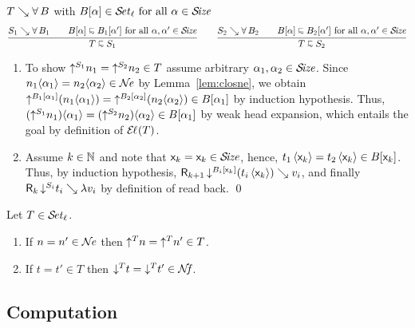 \documentclass[acmlarge,review,anonymous]{acmart}\settopmatter{printfolios=true}
\makeatletter
\newenvironment{proof*}[1][\proofname]{\par
  \normalfont \topsep6\p@\@plus6\p@\relax
  \trivlist
  \item[\@proofindent\hskip\labelsep
        {\@proofnamefont #1\@addpunct{.}}]\ignorespaces
}{%
  \endtrivlist\@endpefalse
}
\makeatother
\begin{document}
\begin{proof*}
\begin{caselist}
\nextcase $T \evalsto \forallT B$ with $B[\alpha] \in \SET[\ell] \mforall \alpha \in \SIZE$
\begin{gather*}
  \ru{S_1 \evalsto \forallT{B_1} \qquad
      B[\alpha] \shape B_1[\alpha'] \mforall \alpha, \alpha' \in \SIZE
    }{T \shape S_1}
\qquad
  \ru{S_2 \evalsto \forallT{B_2} \qquad
      B[\alpha] \shape B_2[\alpha'] \mforall \alpha, \alpha' \in \SIZE
    }{T \shape S_2}
\end{gather*}
\begin{enumerate}
\item To show $\up{S_1}{n_1} = \up{S_2}{n_2} \in T$ assume arbitrary $\alpha_1,\alpha_2 \in \SIZE$.
  Since $n_1 \ann{\alpha_1} = n_2 \ann{\alpha_2} \in \NE$ by Lemma~\ref{lem:closne}, we obtain
  $\up{B_1[\alpha_1]}{(n_1 \ann{\alpha_1})} = \up{B_2[\alpha_2]}{(n_2 \ann{\alpha_2})} \in B[\alpha_1]$
  by induction hypothesis.
  Thus, $(\up{S_1}{n_1}) \ann{\alpha_1} = (\up{S_2}{n_2}) \ann{\alpha_2} \in B[\alpha_1]$
  by weak head expansion, which entails the goal by definition of $\EL(T)$.
\item Assume $k \in \NN$ and note that $\lev k = \lev k \in \SIZE$, hence,
  $t_1\,\ann{\lev k} = t_2\,\ann{\lev k} \in B[\lev k]$.  Thus, by induction hypothesis,
  $\R{k+1}{\down{B_i[\lev k]}(t_i\,\ann{\lev k})}{v_i}$, and finally
  $\R k {\down{S_i} t_i} {\lambda v_i}$ by definition of read back.
\qed
\end{enumerate}

\end{caselist}
\end{proof*}

\begin{corollary}
  \label{cor:rere}
  Let\/ $T \in \SET[\ell]$.
  \begin{enumerate}
  \item If\/ $n = n' \in \NE$ then $\up T n = \up T n' \in T$.
  \item If\/ $t = t' \in T$ then $\down T t = \down T {t'} \in \NF$.
  \end{enumerate}
\end{corollary}


\subsection{Computation}
\label{sec:comp}
\end{document}
